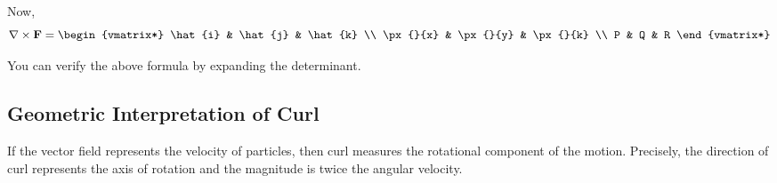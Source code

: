 Now, 
$$
\nabla \times {\bf F} =
\begin{vmatrix*}
  \hat{i} & \hat{j} & \hat{k} \\
  \px{}{x} & \px{}{y} & \px{}{k} \\
  P & Q & R
\end{vmatrix*}
$$

You can verify the above formula by expanding the determinant.

\subsection{Geometric Interpretation of Curl}

If the vector field represents the velocity of particles, 
then curl measures the rotational component of the motion.
Precisely, the direction of curl represents the axis of rotation and the magnitude is twice the angular velocity.

